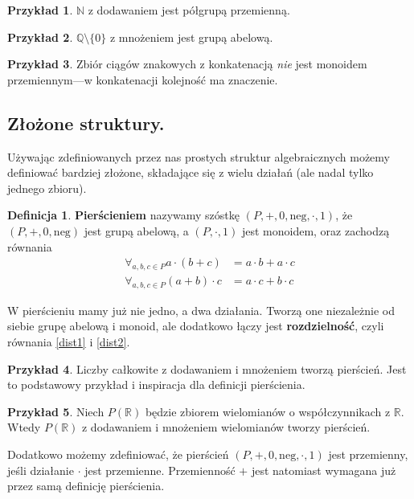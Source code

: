 \documentclass{book}
\theoremstyle{definition}
\newtheorem{definition}{Definicja}[section]
\newtheorem{example}{Przykład}[section]
\begin{document}
\begin{example}
	$\mathbb{N}$ z dodawaniem jest półgrupą przemienną.
\end{example}

\begin{example}
	$\mathbb{Q}\setminus\{0\}$ z mnożeniem jest grupą abelową.
\end{example}

\begin{example}
	Zbiór ciągów znakowych z konkatenacją \textit{nie} jest monoidem przemiennym---w konkatenacji kolejność ma znaczenie.
\end{example}

\subsection{Złożone struktury.}
Używając zdefiniowanych przez nas prostych struktur algebraicznych możemy definiować bardziej złożone,
	składające się z wielu działań (ale nadal tylko jednego zbioru).

\begin{definition}
	\textbf{Pierścieniem} nazywamy szóstkę $(P, +, 0, \mathrm{neg}, \cdot, 1)$,
		że $(P, +, 0, \mathrm{neg})$ jest grupą abelową,
		a $(P, \cdot, 1)$ jest monoidem,
		oraz zachodzą równania
		\begin{align}
			\label{dist1}\forall_{a, b, c \in P} a \cdot (b + c) &= a \cdot b + a \cdot c \\
			\label{dist2}\forall_{a, b, c \in P} (a + b) \cdot c &= a \cdot c + b \cdot c
		\end{align}
\end{definition}

W pierścieniu mamy już nie jedno,
	a dwa działania.
Tworzą one niezależnie od siebie grupę abelową i monoid,
	ale dodatkowo łączy jest \textbf{rozdzielność},
	czyli równania \eqref{dist1} i \eqref{dist2}.

\begin{example}
	Liczby całkowite z dodawaniem i mnożeniem tworzą pierścień.
	Jest to podstawowy przykład i inspiracja dla definicji pierścienia.
\end{example}

\begin{example}
	Niech $P(\mathbb{R})$ będzie zbiorem wielomianów o współczynnikach z $\mathbb{R}$.
	Wtedy $P(\mathbb{R})$ z dodawaniem i mnożeniem wielomianów tworzy pierścień.
\end{example}

Dodatkowo możemy zdefiniować,
	że pierścień $(P, +, 0, \mathrm{neg}, \cdot, 1)$ jest przemienny,
	jeśli działanie $\cdot$ jest przemienne.
Przemienność $+$ jest natomiast wymagana już przez samą definicję pierścienia.
\end{document}
